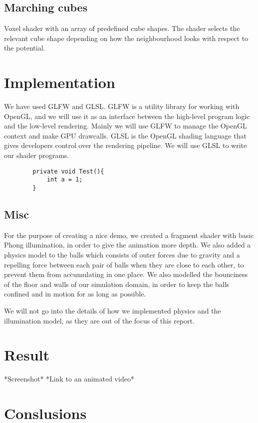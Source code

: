 \documentclass{article}
\begin{document}
        \subsection{Marching cubes}
            Voxel shader with an array of predefined cube shapes. The shader selects the relevant cube shape depending on how the neighbourhood looks with respect to the potential.

    \section{Implementation}

        We have used GLFW and GLSL. GLFW is a utility library for working with OpenGL, and we will use it as an interface between the high-level program logic and the low-level rendering. Mainly we will use GLFW to manage the OpenGL context and make GPU drawcalls. GLSL is the OpenGL shading language that gives developers control over the rendering pipeline. We will use GLSL to write our shader programs.

        \begin{lstlisting}
        private void Test(){
            int a = 1;
        }
        \end{lstlisting}

        \subsection{Misc}
            For the purpose of creating a nice demo, we created a fragment shader with basic Phong illumination, in order to give the animation more depth.
            We also added a physics model to the balls which consists of outer forces due to gravity and a repelling force between each pair of balls when they are close to each other, to prevent them from accumulating in one place.
            We also modelled the bounciness of the floor and walls of our simulation domain, in order to keep the balls confined and in motion for as long as possible.

            We will not go into the details of how we implemented physics and the illumination model, as they are out of the focus of this report.

    \section{Result}
        *Screenshot*
        *Link to an animated video*

    \section{Conslusions}
    
\end{document}
